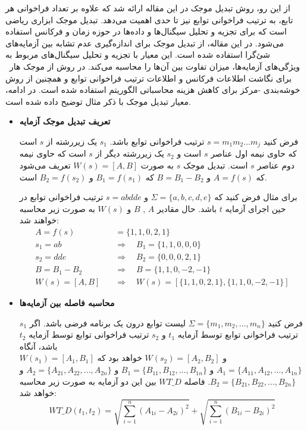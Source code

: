 از این رو، روش تبدیل موجک در این مقاله ارائه شد که علاوه بر تعداد فراخوانی هر تابع، به ترتیب فراخوانی توابع نیز تا حدی اهمیت می‌دهد. تبدیل موجک ابزاری ریاضی است که برای تجزیه و تحلیل سیگنال‌ها و داده‌ها در حوزه زمان و فرکانس استفاده می‌شود\cite{stankovic2005haar}\cite{egiazarian2002tree}\cite{kulkarni2011wavelet}. در این مقاله\cite{chen2021novel}، از تبدیل موجک برای اندازه‌گیری عدم تشابه بین آزمایه‌های شئ‌گرا استفاده شده است. این معیار با تجزیه و تحلیل سیگنال‌های مربوط به ویژگی‌های آزمایه‌ها، میزان تفاوت بین آن‌ها را محاسبه می‌کند. در روش
 از موجک هار~\cite{stankovic2005haar} برای نگاشت اطلاعات فرکانس و اطلاعات ترتیب فراخوانی توابع و همچنین از روش خوشه‌بندی -مرکز برای کاهش هزینه محاسباتی الگوریتم استفاده شده است. در ادامه، معیار تبدیل موجک با ذکر مثال توضیح داده شده است.

\begin{itemize}
	\item \textbf{تعریف تبدیل موجک آزمایه}
	
فرض کنید \(s = m_1 m_2 \dots m_j\) ترتیب فراخوانی توابع باشد. \(s_1\) یک زیررشته از \(s\) است که حاوی نیمه اول عناصر \(s\) است و \(s_2\) یک زیررشته دیگر از \(s\) است که حاوی نیمه دوم عناصر \(s\) است. تبدیل موجک \(s\) به صورت \(W(s) = [A, B]\) تعریف می‌شود که \(A = f(s)\) و \(B = B_1 - B_2\) که \(B_1 = f(s_1)\) و \(B_2 = f(s_2)\) است.

برای مثال فرض کنید که \(\Sigma = \{a, b, c, d, e\}\) و \(s = abdde\) ترتیب فراخوانی توابع در حین اجرای آزمایه \(t\) باشد. حال مقادیر \(A\) , \(B\) و \(W(s)\) به صورت زیر محاسبه خواهند شد:
\begin{align*}
	A = f(s) &= \{1, 1, 0, 2, 1\} \\
	s_1 = ab \quad & \Rightarrow \quad B_1 = \{1, 1, 0, 0, 0\} \\
	s_2 = dde \quad &\Rightarrow \quad B_2 = \{0, 0, 0, 2, 1\} \\
	B = B_1 - B_2 \quad &\Rightarrow \quad B = \{1, 1, 0, -2, -1\} \\
	W(s) = [A, B] \quad &\Rightarrow \quad W(s) = \left[\{1, 1, 0, 2, 1\}, \{1, 1, 0, -2, -1\}\right]
\end{align*}

\item \textbf{محاسبه فاصله بین آزمایه‌‌ها}

فرض کنید \(\Sigma = \{m_1, m_2, \dots, m_n\}\) لیست توابع درون یک برنامه فرضی باشد. اگر \(s_1\) ترتیب فراخوانی توابع توسط آزمایه \(t_1\) و \(s_2\) ترتیب فراخوانی توابع توسط آزمایه \(t_2\) باشد، آنگاه\\ \(W(s_1) = [A_1, B_1]\) و \(W(s_2) = [A_2, B_2]\) خواهد بود که \(A_1 = \{A_{11}, A_{12}, \dots, A_{1n}\}\) و \(B_1 = \{B_{11}, B_{12}, \dots, B_{1n}\}\) و \(A_2 = \{A_{21}, A_{22}, \dots, A_{2n}\}\) و \(B_2 = \{B_{21}, B_{22}, \dots, B_{2n}\}\). فاصله \(WT\_D\) بین این دو آزمایه به صورت زیر محاسبه خواهد شد:
\[
WT\_D(t_1, t_2) = \sqrt{\sum_{i=1}^{n} (A_{1i} - A_{2i})^2} + \sqrt{\sum_{i=1}^{n} (B_{1i} - B_{2i})^2}
\]


\end{itemize}

